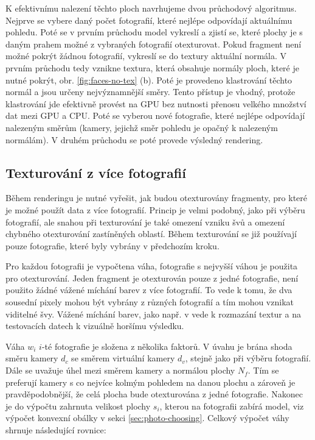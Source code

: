 \documentclass[11pt,twoside,a4paper]{book}
\begin{document}
K efektivnímu nalezení těchto ploch navrhujeme dvou průchodový algoritmus. Nejprve se vybere daný počet fotografií, které nejlépe odpovídají aktuálnímu pohledu. Poté se v prvním průchodu model vykreslí a zjistí se, které plochy je s daným prahem možné z vybraných fotografií otexturovat. Pokud fragment není možné pokrýt žádnou fotografií, vykreslí se do textury aktuální normála. V prvním průchodu tedy vznikne textura, která obsahuje normály ploch, které je nutné pokrýt, obr. \ref{fig:faces-no-tex} (b). Poté je provedeno klastrování těchto normál a jsou určeny nejvýznamnější směry. Tento přístup je vhodný, protože klastrování jde efektivně provést na GPU bez nutnosti přenosu velkého množství dat mezi GPU a CPU. Poté se vyberou nové fotografie, které nejlépe odpovídají nalezeným směrům (kamery, jejichž směr pohledu je opačný k nalezeným normálám). V druhém průchodu se poté provede výsledný rendering. 

\subsection{Texturování z více fotografií}
\label{sec:fragment-texturing}
Během renderingu je nutné vyřešit, jak budou otexturovány fragmenty, pro které je možné použít data z více fotografií. Princip je velmi podobný, jako při výběru fotografií, ale snahou při texturování je také omezení vzniku švů a omezení chybného otexturování zastíněných oblastí. Během texturování se již používají pouze fotografie, které byly vybrány v předchozím kroku.

Pro každou fotografii je vypočtena váha, fotografie s nejvyšší váhou je použita pro otexturování. Jeden fragment je otexturován pouze z jedné fotografie, není použito žádné vážené míchání barev z více fotografií. To vede k tomu, že dva sousední pixely mohou být vybrány z různých fotografií a tím mohou vznikat viditelné švy. Vážené míchání barev, jako např. v \cite{Debevec96} vede k rozmazání textur a na testovacích datech k vizuálně horšímu výsledku. 

Váha $w_i$ $i$-té fotografie je složena z několika faktorů. V úvahu je brána shoda směru kamery $d_c$ se směrem virtuální kamery $d_v$, stejně jako při výběru fotografií. Dále se uvažuje úhel mezi směrem kamery a normálou plochy $N_f$. Tím se preferují kamery s co nejvíce kolmým pohledem na danou plochu a zároveň je pravděpodobnější, že celá plocha bude otexturována z jedné fotografie. Nakonec je do výpočtu zahrnuta  velikost plochy $s_i$, kterou na fotografii zabírá model, viz výpočet konvexní obálky v sekci \ref{sec:photo-choosing}. Celkový výpočet váhy shrnuje následující rovnice:
\end{document}
